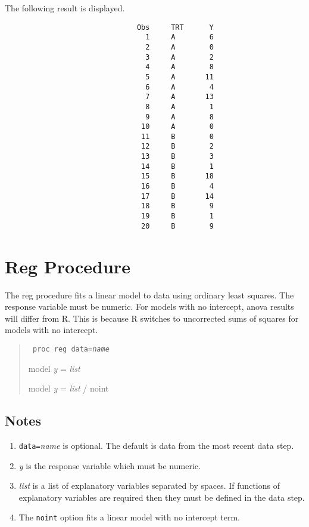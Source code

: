 \documentclass[12pt]{article}
\begin{document}
The following result is displayed.

\begin{Verbatim}
                               Obs     TRT      Y
                                 1     A        6
                                 2     A        0
                                 3     A        2
                                 4     A        8
                                 5     A       11
                                 6     A        4
                                 7     A       13
                                 8     A        1
                                 9     A        8
                                10     A        0
                                11     B        0
                                12     B        2
                                13     B        3
                                14     B        1
                                15     B       18
                                16     B        4
                                17     B       14
                                18     B        9
                                19     B        1
                                20     B        9
\end{Verbatim}

\newpage

\section{Reg Procedure}
The reg procedure fits a linear model to data
using ordinary least squares.
The response variable must be numeric.
For models with no intercept, anova results will differ from R.
This is because R switches to uncorrected sums of squares
for models with no intercept.

\begin{quote}
{\tt
proc reg data={\it name}

model {\it y} = {\it list}

model {\it y} = {\it list} / noint
}
\end{quote}

\subsection*{Notes}
\begin{enumerate}
\item
{\tt data=}{\it name} is optional.
The default is data from the most recent data step.
\item
{\it y} is the response variable which must be numeric.
\item
{\it list} is a list of explanatory variables separated by spaces.
If functions of explanatory variables are required then
they must be defined in the data step.
\item
The {\tt noint} option fits a linear model with no intercept term.
\end{enumerate}
\end{document}
